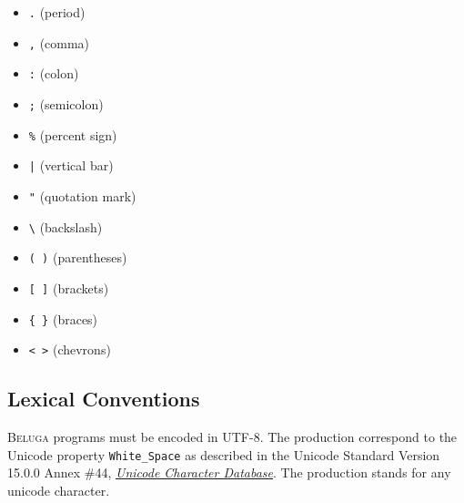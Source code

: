 \documentclass[11pt]{article}
\newcommand{\Beluga}{\textsc{Beluga}\xspace}
\begin{document}
{\setlength{\columnseprule}{0.4pt}
\begin{multicols}{3}
\begin{itemize}[label={}]
\item \texttt{.} \hfill (period)
\item \texttt{,} \hfill (comma)
\item \texttt{:} \hfill (colon)
\item \texttt{;} \hfill (semicolon)
\item \texttt{\%} \hfill (percent sign)
\item \texttt{|} \hfill (vertical bar)
\item \texttt{"} \hfill (quotation mark)
\item \texttt{\textbackslash} \hfill (backslash)
\item \texttt{( )} \hfill (parentheses)
\item \texttt{[ ]} \hfill (brackets)
\item \texttt{\{ \}} \hfill (braces)
\item \texttt{< >} \hfill (chevrons)
\end{itemize}
\end{multicols}
}

\subsection{Lexical Conventions}

\Beluga programs must be encoded in \textsc{UTF-8}.
The production  correspond to the Unicode property \texttt{White\_Space} as described in the Unicode Standard Version 15.0.0 Annex \#44, \href{https://www.unicode.org/reports/tr44/tr44-30.html#White_Space}{\textit{Unicode Character Database}}.
The production  stands for any unicode character.
\end{document}
